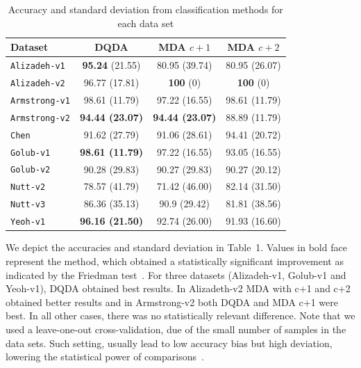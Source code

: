 \documentclass[runningheads,a4paper]{llncs}
\begin{document}
\begin{table}[htp]
\caption{Accuracy and standard deviation from classification methods for each data set \label{results}}
\begin{center}
\begin{footnotesize}
\begin{tabular}{|l|c|c|c|}
  \hline
  \bf{Dataset}     & DQDA    & MDA $c+1$  & MDA $c+2$  \\
  \hline
  {\tt Alizadeh-v1}  & \textbf{95.24} (21.55) 	& 80.95 (39.74)  	& 80.95 (26.07) \\  
  {\tt Alizadeh-v2}  & 96.77 (17.81)   			& \textbf{100} (0) 	& \textbf{100} (0) \\  
  {\tt Armstrong-v1} & 98.61 (11.79)			& 97.22 (16.55)  	& 98.61 (11.79) \\           
  {\tt Armstrong-v2} & \bf{94.44} (23.07) &\bf{94.44} (23.07) & 88.89 (11.79)       \\    
  {\tt Chen}         & 91.62 (27.79)	& 91.06 (28.61)	& 94.41 (20.72)       \\
  {\tt Golub-v1}   & \bf{98.61} (11.79) & 97.22 (16.55)	& 93.05 (16.55)        \\
 {\tt Golub-v2}     & 90.28 (29.83) & 90.27 (29.83)  & 90.27 (20.12)        \\           
 {\tt Nutt-v2} 		& 78.57 (41.79)	& 71.42 (46.00)  & 82.14 (31.50)        \\      
 {\tt Nutt-v3}      & 86.36 (35.13) & 90.9 (29.42) & 81.81 (38.56)        \\             
 {\tt Yeoh-v1}      & \bf{96.16} (21.50)	& 92.74 (26.00)	& 91.93 (16.60)       \\ 
 \hline
\end{tabular}
\end{footnotesize}
\end{center}
\end{table}

We depict the accuracies and standard deviation in Table~1. Values in
bold face represent the method, which obtained a statistically
significant improvement as indicated by the Friedman
test~\cite{Dem2006}. For three datasets (Alizadeh-v1, Golub-v1 and
Yeoh-v1), DQDA obtained best results. In Alizadeth-v2 MDA with c+1 and
c+2 obtained better results and in Armstrong-v2 both DQDA and MDA c+1
were best. In all other cases, there was no statistically relevant
difference. Note that we used a leave-one-out cross-validation,
due of the small number of samples in the data sets. Such setting,
usually lead to low accuracy bias but high deviation, lowering the
statistical power of comparisons~\cite{Braga-Neto2004}.
\end{document}
